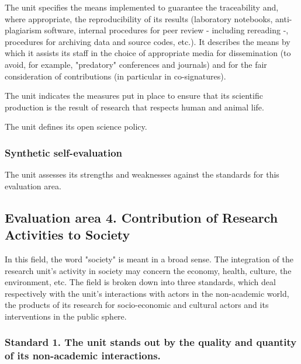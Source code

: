\begin{hceresinstructions}
  The unit specifies the means implemented to guarantee the traceability
  and, where appropriate, the reproducibility of its results (laboratory
  notebooks, anti-plagiarism software, internal procedures for peer review
  - including rereading -, procedures for archiving data and source codes,
  etc.). It describes the means by which it assists its staff in the
  choice of appropriate media for dissemination (to avoid, for example,
  "predatory" conferences and journals) and for the fair consideration of
  contributions (in particular in co-signatures).

  The unit indicates the measures put in place to ensure that its
  scientific production is the result of research that respects human and
  animal life.

  The unit defines its open science policy.
\end{hceresinstructions}

\subsubsection*{Synthetic self-evaluation}

\begin{hceresinstructions}
  The unit assesses its strengths and weaknesses against the standards for
  this evaluation area.
\end{hceresinstructions}

\subsection*{Evaluation area 4. Contribution of Research Activities to Society}

\begin{hceresinstructions}
  In this field, the word "society" is meant in a broad sense. The
  integration of the research unit's activity in society
  may concern the economy, health, culture, the environment, etc. The
  field is broken down into three standards, which deal respectively with
  the unit's interactions with actors in the non-academic
  world, the products of its research for socio-economic and cultural
  actors and its interventions in the public sphere.
\end{hceresinstructions}

\subsubsection*{Standard 1. The unit stands out by the quality and quantity of its
non-academic interactions.}

